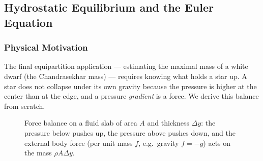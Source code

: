 \subsection{Hydrostatic Equilibrium and the Euler Equation}
\label{sec:lec09:hydrostatics}

\subsubsection*{Physical Motivation}
The final equipartition application --- estimating the maximal mass of a white
dwarf (the Chandrasekhar mass) --- requires knowing what holds a star up. A
star does not collapse under its own gravity because the pressure is higher at
the center than at the edge, and a pressure \emph{gradient} is a force. We
derive this balance from scratch.

\begin{figure}[ht]
    \centering
    \caption{Force balance on a fluid slab of area $A$ and thickness
    $\Delta y$: the pressure below pushes up, the pressure above pushes down,
    and the external body force (per unit mass $f$, e.g.\ gravity
    $f=-g$) acts on the mass $\rho A\Delta y$.}
    \label{fig:lec09:hydrostatic-slab}
\end{figure}

